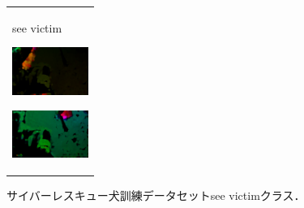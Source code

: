 \begin{figure}[H]
\begin{tabular}{l}
\begin{minipage}{0.165\hsize}
\begin{center}
          \hspace{2.0cm} {see victim}
        \end{center}
      \end{minipage}
      \begin{minipage}{0.165\hsize}
        \begin{center}
          \includegraphics[clip, width=2.5cm]{./Figures/optic_seevictim4.eps}
          \hspace{0.1cm} { }
        \end{center}
      \end{minipage}
      \begin{minipage}{0.165\hsize}
        \begin{center}
          \includegraphics[clip, width=2.5cm]{./Figures/optic_seevictim5.eps}
          \hspace{2.2cm} { }
        \end{center}
      \end{minipage}
    \end{tabular}
    \caption{サイバーレスキュー犬訓練データセットsee victimクラス．}
    \label{seevictim}
\end{figure}

